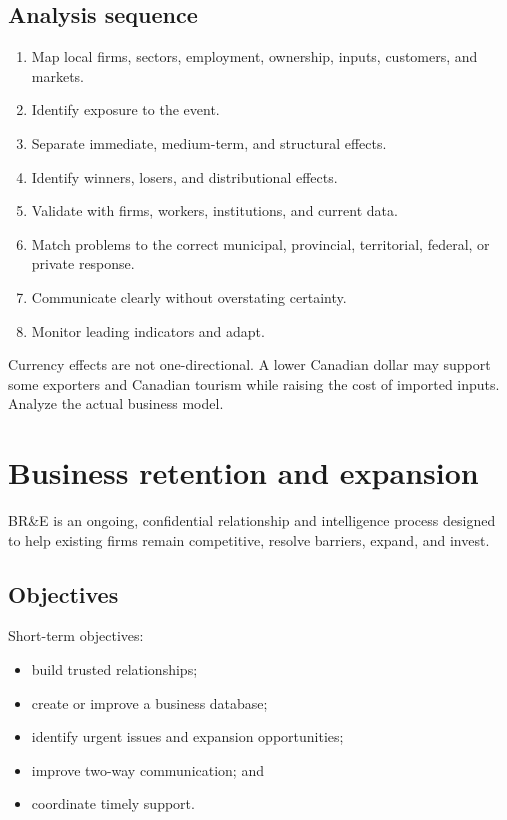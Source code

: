\documentclass[11pt,letterpaper,oneside,openany]{book}
\begin{document}
\subsection[Analysis sequence]{Analysis sequence}
\begin{enumerate}
\item Map local firms, sectors, employment, ownership, inputs, customers, and markets.
\item Identify exposure to the event.
\item Separate immediate, medium-term, and structural effects.
\item Identify winners, losers, and distributional effects.
\item Validate with firms, workers, institutions, and current data.
\item Match problems to the correct municipal, provincial, territorial, federal, or private response.
\item Communicate clearly without overstating certainty.
\item Monitor leading indicators and adapt.
\end{enumerate}


Currency effects are not one-directional. A lower Canadian dollar may support some exporters and Canadian tourism while raising the cost of imported inputs. Analyze the actual business model.


\section[Business retention and expansion]{Business retention and expansion}
BR\&E is an ongoing, confidential relationship and intelligence process designed to help existing firms remain competitive, resolve barriers, expand, and invest.


\subsection[Objectives]{Objectives}
Short-term objectives:


\begin{itemize}
\item build trusted relationships;
\item create or improve a business database;
\item identify urgent issues and expansion opportunities;
\item improve two-way communication; and
\item coordinate timely support.
\end{itemize}
\end{document}
